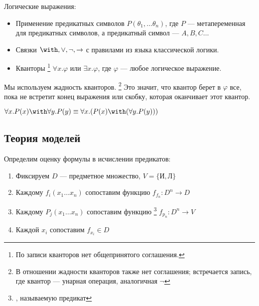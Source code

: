 Логические выражения:
\begin{itemize}
    \item Применение предикатных символов \(P(\theta_1, \dots \theta_n)\), где \(P\) --- метапеременная для предикатных символов, а предикатный символ --- \(A, B, C \dots \)
    \item Связки \(\with, \lor, \neg, \to \) с правилами из языка классической логики.
    \item Кванторы \footnote{По записи кванторов нет общепринятого соглашения.} \(\forall x.\varphi\) или \(\exists x.\varphi\), где \(\varphi\) --- любое логическое выражение.
\end{itemize}

Мы используем жадность кванторов. \footnote{В отношении жадности кванторов также нет соглашения; встречается запись, где квантор --- унарная операция, аналогичная \(\neg\)} Это значит, что квантор берет в \(\varphi\) все, пока не встретит конец выражения или скобку, которая оканчивает этот квантор.

\begin{example}
    \(\forall x.P(x) \with \forall y.P(y) \equiv \forall x.(P(x) \with (\forall y.P(y)))\)
\end{example}

\subsection{Теория моделей}

Определим оценку формулы в исчислении предикатов:

\begin{enumerate}
    \item Фиксируем \(D\) --- предметное множество, \(V = \{\text{И}, \text{Л}\} \)
    \item Каждому \(f_i(x_1 \dots x_n)\) сопоставим функцию \(f_{f_n} : D^n \to D\)
    \item Каждому \(P_j(x_1 \dots x_n)\) сопоставим функцию \footnote{,  называемую предикат} \(f_{p_n} : D^n \to V\)
    \item Каждой \(x_i\) сопоставим \(f_{x_i}\in D\)
\end{enumerate}

